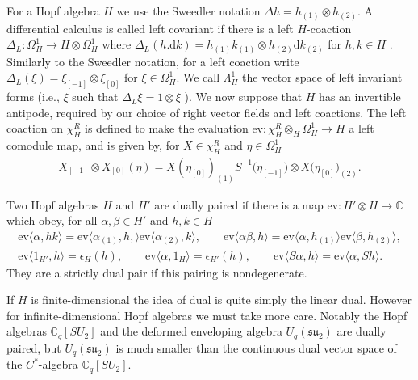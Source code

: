 \documentclass[pdftex]{sigma}
\numberwithin{equation}{section}
\newcommand{\ev}{\mathrm{ev}}
\newcommand{\extd}{\mathrm{d}}
\newcommand{\tens}{\mathop{\otimes}}
\newcommand{\C}{\mathbb{C}}
\newcommand{\<}{\langle}
\renewcommand{\>}{\rangle}
\begin{document}
For a Hopf algebra $ H $ we use the Sweedler notation $ \Delta h =h_{(1)}\tens h_{(2)}$. A differential calculus is called left covariant if there is a left $ H $-coaction $ \Delta_{L}\colon \Omega_{H}^{1} \rightarrow H \tens \Omega_{H}^{1} $ where $ \Delta_{L} (h. \extd k)= h_{(1)} k_{(1)} \tens h_{(2)} \extd k_{(2)} $ for $ h,k \in H $ \cite{WoroCal}. Similarly to the Sweedler notation, for a left coaction write $ \Delta_{L} (\xi)=\xi_{[-1]}\tens \xi_{[0]}$ for $ \xi \in \Omega_{H}^{1} $. We call $\Lambda_{H}^{1} $ the vector space of left invariant forms (i.e., $ \xi $ such that $\Delta_{L} \xi= 1 \tens \xi$ ). We now suppose that $ H $ has an invertible antipode, required by our choice of right vector fields and left coactions. The left coaction on $ \chi^{R}_H $ is defined to make the evaluation $ \ev\colon \chi^{R} _H \tens_{H} \Omega_{H}^{1}\rightarrow H$ a left comodule map, and is given by, for $ X \in \chi^{R}_H $ and $ \eta \in \Omega_{H}^{1}$
\begin{gather*}
	X_{[-1]}\tens X_{[0]} (\eta)=X(\eta_{[0]})_{(1)} S^{-1}\big(\eta_{[-1]}\big) \tens X\big(\eta_{[0]}\big)_{(2)}.
\end{gather*}
\begin{Definition}\label{D1}
	Two Hopf algebras $ H $ and $ H' $ are dually paired if there is a map $ \ev \colon H' \tens H\allowbreak \rightarrow \C $ which obey, for all $ \alpha, \beta \in H' $ and $ h,k \in H $
	\begin{gather*}
	\ev \langle \alpha, h k \rangle =\ev \langle \alpha_{(1)}, h, \rangle \ev \langle \alpha_{(2)}, k \rangle, \qquad \ev \langle \alpha \beta, h \rangle =\ev \langle \alpha, h_{(1)} \rangle \ev \langle \beta, h_{(2)} \rangle,\\
	\ev \langle 1_{H'}, h \rangle = \epsilon _{H} (h), \qquad \ev \langle \alpha, 1_{H} \rangle = \epsilon _{H'} (h), \qquad \ev \langle S \alpha, h\rangle =\ev \langle \alpha, S h\rangle.
	\end{gather*}
They are a strictly dual pair if this pairing is nondegenerate.

If $ H $ is finite-dimensional the idea of dual is quite simply the linear dual. However for infinite-dimensional Hopf algebras we must take more care. Notably the Hopf algebras $ \C_{q}[SU_{2}] $ and the deformed enveloping algebra $ U_{q}({\mathfrak{su}}_{2}) $ are dually paired, but $ U_{q}({\mathfrak{su}}_{2}) $ is much smaller than the continuous dual vector space of the $ C^{*} $-algebra $ \C_{q}[SU_{2}] $.
\end{Definition}
\end{document}
